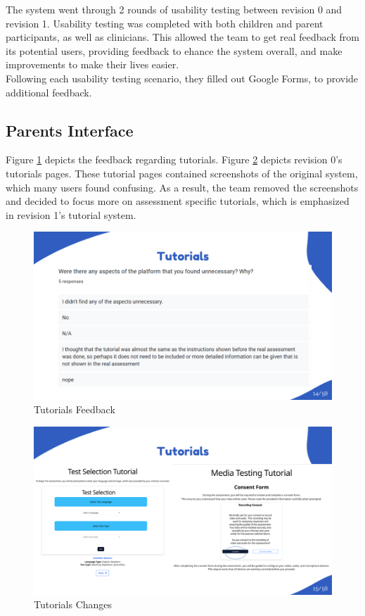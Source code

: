 \documentclass{article}
\begin{document}
\hspace{2em} The system went through 2 rounds of usability testing between revision 0 and revision 1. Usability testing was completed with both children and parent participants, as well as clinicians.
This allowed the team to get real feedback from its potential users, providing feedback to ehance the system overall, and make improvements to make their lives easier.\\
Following each usability testing scenario, they filled out Google Forms, to provide additional feedback.

\subsection{Parents Interface}

\hspace{2em} Figure \ref{fig:tutorials_feedback} depicts the feedback regarding tutorials. Figure \ref{fig:tutorials_changes} depicts revision 0's tutorials pages.
These tutorial pages contained screenshots of the original system, which many users found confusing. As a result, the team removed the screenshots and decided to focus more on
assessment specific tutorials, which is emphasized in revision 1's tutorial system.

\begin{figure}[H]
  \centering
  \includegraphics[width=\textwidth]{images/slide14.png}
  \caption{Tutorials Feedback}
  \label{fig:tutorials_feedback}
\end{figure}

\begin{figure}[H]
  \centering
  \includegraphics[width=\textwidth]{images/slide15.png}
  \caption{Tutorials Changes}
  \label{fig:tutorials_changes}
\end{figure}
\end{document}

